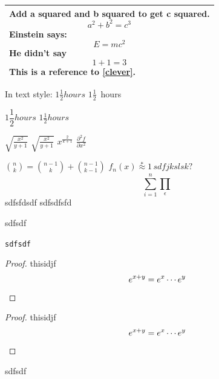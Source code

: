 \documentclass[11pt]{article}
\begin{document}
\begin{tabular}{|p{4.7cm}|}
\hline
Add a squared and b squared to get c squared.
\begin{equation}
	a^2+b^2=c^3
\end{equation}
Einstein says:
\begin{equation}
	E=mc^2\label{clever}
\end{equation}
He didn't say
\begin{equation}
	1+1=3 \tag{dumb}
\end{equation}
This is a reference to \eqref{clever}.\\
\hline
\end{tabular}

In text style:
$1\frac{1}{2} hours$
$1\frac{1}{2}$~hours

$1\dfrac{1}{2} hours$ \qquad
$1\tfrac{1}{2} hours$

$\sqrt{\frac{x^2}{y+1}}$
$\surd{\frac{x^2}{y+1}}$
$x^{\frac{2}{k+1}}$
$\frac{\partial^2f}{\partial{x^2}}$

$\binom{n}{k}=\binom{n-1}{k}+\binom{n-1}
{k-1}$ 
$f_n(x)\stackrel{*}{\approx}1 \, sdfjkslsk?$
\begin{equation}
\sum_{i=1}^n
\prod_\epsilon
\end{equation}
sdfsfdsdf
sdfsdfsfd

sdfsdf

\verb.sdfsdf.


\begin{proof}
	thisidjf
	\[e^{x+y}=e^x\cdots e^y \qedhere\]
\end{proof}
\begin{proof}
	thisidjf
	$$e^{x+y}=e^x\cdots e^y \qedhere$$
\end{proof}

sdfsdf
\end{document}
